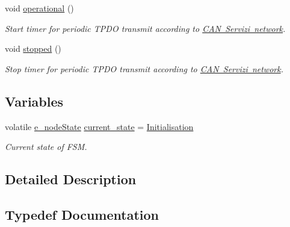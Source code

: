 \begin{DoxyCompactItemize}
void \mbox{\hyperlink{group___c_a_nopen___f_s_m__module_ga003b28d176774c489577f471a7b5f946}{operational}} ()
\begin{DoxyCompactList}\small\item\em Start timer for periodic T\+P\+DO transmit according to \mbox{\hyperlink{_c_a_n_network_page}{C\+AN Servizi network}}. \end{DoxyCompactList}\item 
void \mbox{\hyperlink{group___c_a_nopen___f_s_m__module_gad134c6ce7186d3f2e9cb314839fd63ad}{stopped}} ()
\begin{DoxyCompactList}\small\item\em Stop timer for periodic T\+P\+DO transmit according to \mbox{\hyperlink{_c_a_n_network_page}{C\+AN Servizi network}}. \end{DoxyCompactList}\end{DoxyCompactItemize}
\subsection*{Variables}
\begin{DoxyCompactItemize}
\item 
\mbox{\label{group___c_a_nopen___f_s_m__module_ga924e56dabe104382db4ee1a3bb507ed9}} 
volatile \mbox{\hyperlink{group___c_a_nopen___f_s_m__module_ga5891f63a4c9243179838389a93d084e2}{e\+\_\+node\+State}} \mbox{\hyperlink{group___c_a_nopen___f_s_m__module_ga924e56dabe104382db4ee1a3bb507ed9}{current\+\_\+state}} = \mbox{\hyperlink{group___c_a_nopen___f_s_m__module_gga3136d2815abe9d284f985e0a7ec68646aeb3ae26d7a1629aa0fc6c83f46306cf5}{Initialisation}}
\begin{DoxyCompactList}\small\item\em Current state of F\+SM. \end{DoxyCompactList}\end{DoxyCompactItemize}


\subsection{Detailed Description}


\subsection{Typedef Documentation}
\mbox{\label{group___c_a_nopen___f_s_m__module_ga5891f63a4c9243179838389a93d084e2}} 
